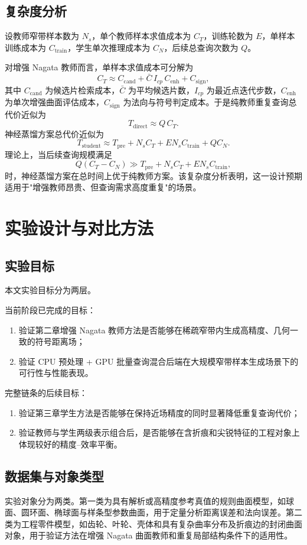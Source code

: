 \documentclass[12pt,oneside]{ctexbook}
\begin{document}
\section{复杂度分析}
设教师窄带样本数为 $N_s$，单个教师样本求值成本为 $C_T$，训练轮数为 $E$，单样本训练成本为 $C_{\mathrm{train}}$，学生单次推理成本为 $C_N$，后续总查询次数为 $Q$。

对增强 Nagata 教师而言，单样本求值成本可分解为
\[
C_T\approx C_{\mathrm{cand}}+\bar C\,I_{cp}\,C_{\mathrm{enh}}+C_{\mathrm{sign}},
\]
其中 $C_{\mathrm{cand}}$ 为候选片检索成本，$\bar C$ 为平均候选片数，$I_{cp}$ 为最近点迭代步数，$C_{\mathrm{enh}}$ 为单次增强曲面评估成本，$C_{\mathrm{sign}}$ 为法向与符号判定成本。于是纯教师重复查询总代价近似为
\[
T_{\mathrm{direct}}\approx Q\,C_T.
\]
神经蒸馏方案总代价近似为
\[
T_{\mathrm{student}}\approx T_{\mathrm{pre}}+N_s C_T + E N_s C_{\mathrm{train}} + Q C_N.
\]
理论上，当后续查询规模满足
\[
Q(C_T-C_N)\gg T_{\mathrm{pre}}+N_s C_T + E N_s C_{\mathrm{train}},
\]
时，神经蒸馏方案在总时间上优于纯教师方案。该复杂度分析表明，这一设计预期适用于"增强教师昂贵、但查询需求高度重复"的场景。

\chapter{实验设计与对比方法}
\section{实验目标}
本文实验目标分为两层。

当前阶段已完成的目标：
\begin{enumerate}[label=\arabic*)]
  \item 验证第二章增强 Nagata 教师方法是否能够在稀疏窄带内生成高精度、几何一致的符号距离场；
  \item 验证 CPU 预处理 + GPU 批量查询混合后端在大规模窄带样本生成场景下的可行性与性能表现。
\end{enumerate}

完整链条的后续目标：
\begin{enumerate}[label=\arabic*)]
  \item 验证第三章学生方法是否能够在保持近场精度的同时显著降低重复查询代价；
  \item 验证教师与学生两级表示组合后，是否能够在含折痕和尖锐特征的工程对象上体现较好的精度--效率平衡。
\end{enumerate}

\section{数据集与对象类型}
实验对象分为两类。第一类为具有解析或高精度参考真值的规则曲面模型，如球面、圆环面、椭球面与样条型参数曲面，用于定量分析距离误差和法向误差。第二类为工程零件模型，如齿轮、叶轮、壳体和具有复杂曲率分布及折痕边的封闭曲面对象，用于验证方法在增强 Nagata 曲面教师和重复局部结构条件下的适用性。
\end{document}
